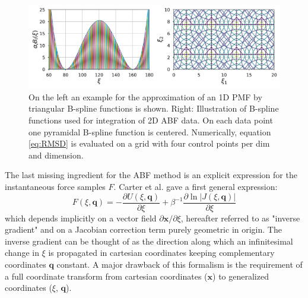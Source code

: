 \begin{figure}[H]
    \centering
    \includegraphics[width=1\textwidth]{bilder/FEM}
    \caption{
      On the left an example for the approximation of an 1D PMF by triangular B-spline functions is shown.
      Right: Illustration of B-spline functions used for integration of 2D ABF data. On each data point one pyramidal B-spline function is centered. Numerically, equation \ref{eq:RMSD} is evaluated on a grid with four control points per dim and dimension.
    }
\label{fig:FEM}%
\end{figure}
The last missing ingredient for the ABF method is an explicit expression for the instantaneous force samples $F$. Carter et al.\autocite{carter1989constrained} gave a first general expression:
\begin{equation}
  F(\xi,\textbf{q}) = -\frac{\partial U(\xi,\textbf{q})}{\partial \xi} + \beta^{-1} \frac{\partial \ln|J(\xi,\textbf{q})|}{\partial\xi} \label{eq:instforce old}
\end{equation}
which depends implicitly on a vector field $\partial \textbf{x} / \partial \xi$, hereafter referred to as "inverse gradient" and on a Jacobian correction term purely geometric in origin. The inverse gradient can be thought of as the direction along which an infinitesimal change in $\xi$ is propagated in cartesian coordinates keeping complementary coordinates $\textbf{q}$ constant. A major drawback of this formalism is the requirement of a full coordinate transform from cartesian coordinates ($\textbf{x}$) to generalized coordinates ($\xi$, $\textbf{q}$).

